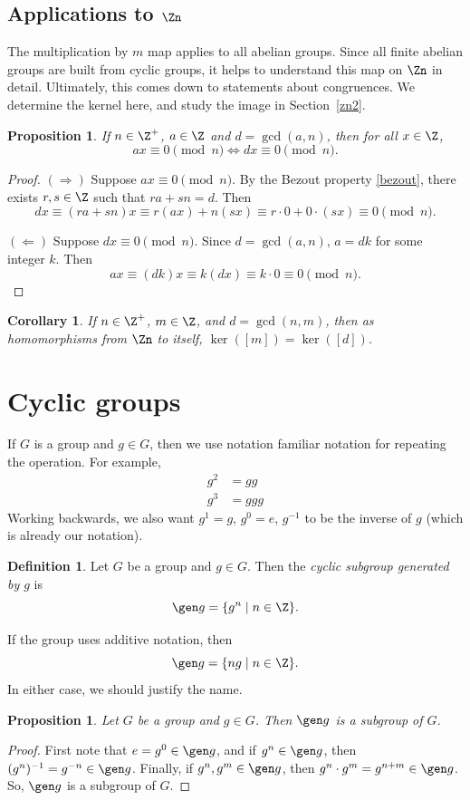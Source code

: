 \documentclass[12pt]{amsart}
\theoremstyle{plain}
\newtheorem{prop}[thm]{Proposition}
\newtheorem{cor}[thm]{Corollary}
\theoremstyle{definition}
\newtheorem{defn}[thm]{Definition}
\theoremstyle{remark}
\begin{document}
\subsection{Applications to $\Zn$}
The multiplication by $m$ map applies to all abelian groups.  Since
all finite abelian groups are built from cyclic groups, it helps to
understand this map on $\Zn$ in detail.  Ultimately, this comes down
to statements about congruences.  We determine the kernel here, and
study the image in Section~\ref{zn2}.


\begin{prop}
  If $n\in \Z^+$, $a\in \Z$ and $d=\gcd(a,n)$, then for all $x\in \Z$,
  \[ ax\equiv 0\pmod n \iff dx\equiv 0 \pmod n.\]
\end{prop}
\begin{proof}
  $(\Rightarrow)$ 
  Suppose $ax\equiv 0\pmod n$.  By the Bezout property \ref{bezout},
  there exists $r,s\in\Z$ such that $ra+sn=d$.  Then
  \[ dx\equiv (ra+sn)x \equiv r(ax)+n(sx)\equiv r\cdot 0+0\cdot
  (sx)\equiv 0 \pmod n.\]

  $(\Leftarrow)$ 
  Suppose $dx\equiv 0\pmod n$.  Since $d=\gcd(a,n)$,
  $a=dk$ for some integer $k$.  Then
  \[ ax \equiv (dk)x\equiv k(dx)\equiv k\cdot 0\equiv 0\pmod n.\]
\end{proof}

\begin{cor} \label{znkernels}
  If $n\in\Z^+$, $m\in\Z$, and $d=\gcd(n,m)$,  then as homomorphisms
  from $\Zn$ to itself, $\ker([m]) = \ker([d])$.
\end{cor}


\section{Cyclic groups}
If $G$ is a group and $g\in G$, then we use notation familiar notation
for repeating the operation.  For example,
\begin{align*}
g^2 &= gg\\
g^3&= ggg
\end{align*}
Working backwards, we also want $g^1=g$, $g^0=e$, $g^{-1}$ to be the
inverse of $g$ (which is already our notation).


\begin{defn}
  Let $G$ be a group and $g\in G$.  Then the \emph{cyclic subgroup
    generated by $g$} is
  \[ \gen g = \{ g^n\mid n\in\Z\}.\]
\end{defn}
If the group uses additive notation, then
\[ \gen g = \{ng\mid n\in\Z\}.\]
In either case, we should justify the name.
\begin{prop}
  Let $G$ be a group and $g\in G$.  Then $\gen g$ is a subgroup of $G$.
\end{prop}
\begin{proof}
  First note that $e=g^0\in \gen g$, and if $g^n\in\gen g$, then
  $(g^n)^{-1} = g^{-n}\in \gen g$.  Finally, if $g^n,g^m\in \gen g$,
  then $g^n\cdot g^m=g^{n+m}\in \gen g$.  So, $\gen g$ is a subgroup
  of $G$.
\end{proof}
\end{document}
